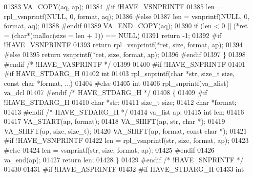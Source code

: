 \begin{DoxyCode}
{{{{{{{{{{01383     VA\_COPY(aq, ap);
01384 \textcolor{preprocessor}{#if !HAVE\_VSNPRINTF}
01385     len = rpl\_vsnprintf(NULL, 0, format, aq);
01386 \textcolor{preprocessor}{#else}
01387     len = vsnprintf(NULL, 0, format, aq);
01388 \textcolor{preprocessor}{#endif}
01389     VA\_END\_COPY(aq);
01390     \textcolor{keywordflow}{if} (len < 0 || (*ret = (\textcolor{keywordtype}{char}*)malloc(size = len + 1)) == NULL)
01391         \textcolor{keywordflow}{return} -1;
01392 \textcolor{preprocessor}{#if !HAVE\_VSNPRINTF}
01393     \textcolor{keywordflow}{return} rpl\_vsnprintf(*ret, size, format, ap);
01394 \textcolor{preprocessor}{#else}
01395     \textcolor{keywordflow}{return} vsnprintf(*ret, size, format, ap);
01396 \textcolor{preprocessor}{#endif}
01397 \}
01398 \textcolor{preprocessor}{#endif  }\textcolor{comment}{/* !HAVE\_VASPRINTF */}\textcolor{preprocessor}{}
01399 
01400 \textcolor{preprocessor}{#if !HAVE\_SNPRINTF}
01401 \textcolor{preprocessor}{#if HAVE\_STDARG\_H}
01402 \textcolor{keywordtype}{int}
01403 rpl\_snprintf(\textcolor{keywordtype}{char} *str, \textcolor{keywordtype}{size\_t} size, \textcolor{keyword}{const} \textcolor{keywordtype}{char} *format, ...)
01404 \textcolor{preprocessor}{#else}
01405 \textcolor{keywordtype}{int}
01406 rpl\_snprintf(va\_alist) va\_dcl
01407 \textcolor{preprocessor}{#endif  }\textcolor{comment}{/* HAVE\_STDARG\_H */}\textcolor{preprocessor}{}
01408 \{
01409 \textcolor{preprocessor}{#if !HAVE\_STDARG\_H}
01410     \textcolor{keywordtype}{char} *str;
01411     \textcolor{keywordtype}{size\_t} size;
01412     \textcolor{keywordtype}{char} *format;
01413 \textcolor{preprocessor}{#endif  }\textcolor{comment}{/* HAVE\_STDARG\_H */}\textcolor{preprocessor}{}
01414     va\_list ap;
01415     \textcolor{keywordtype}{int} len;
01416 
01417     VA\_START(ap, format);
01418     VA\_SHIFT(ap, str, \textcolor{keywordtype}{char} *);
01419     VA\_SHIFT(ap, size, \textcolor{keywordtype}{size\_t});
01420     VA\_SHIFT(ap, format, \textcolor{keyword}{const} \textcolor{keywordtype}{char} *);
01421 \textcolor{preprocessor}{#if !HAVE\_VSNPRINTF}
01422     len = rpl\_vsnprintf(str, size, format, ap);
01423 \textcolor{preprocessor}{#else}
01424     len = vsnprintf(str, size, format, ap);
01425 \textcolor{preprocessor}{#endif}
01426     va\_end(ap);
01427     \textcolor{keywordflow}{return} len;
01428 \}
01429 \textcolor{preprocessor}{#endif  }\textcolor{comment}{/* !HAVE\_SNPRINTF */}\textcolor{preprocessor}{}
01430 
01431 \textcolor{preprocessor}{#if !HAVE\_ASPRINTF}
01432 \textcolor{preprocessor}{#if HAVE\_STDARG\_H}
01433 \textcolor{keywordtype}{int}
}}}}}}}}}}
\end{DoxyCode}
